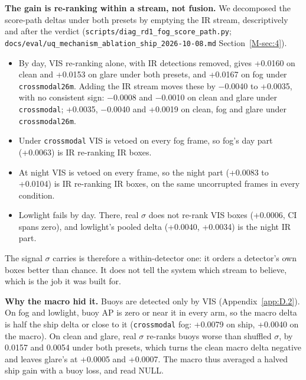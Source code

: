 \documentclass[journal,onecolumn]{IEEEtran}
\begin{document}
\textbf{The gain is re-ranking within a stream, not fusion.} We decomposed the score-path deltas under both presets by emptying the IR stream, descriptively and after the verdict (\texttt{scripts/\allowbreak{}diag\_\allowbreak{}rd1\_\allowbreak{}fog\_\allowbreak{}score\_\allowbreak{}path.py}; \texttt{docs/\allowbreak{}eval/\allowbreak{}uq\_\allowbreak{}mechanism\_\allowbreak{}ablation\_\allowbreak{}ship\_\allowbreak{}2026-\allowbreak{}10-\allowbreak{}08.md} Section~\ref{M-sec:4}).
\begin{itemize}
\item By day, VIS re-ranking alone, with IR detections removed, gives +0.0160 on clean and +0.0153 on glare under both presets, and +0.0167 on fog under \texttt{crossmodal26m}. Adding the IR stream moves these by $-$0.0040 to +0.0035, with no consistent sign: $-$0.0008 and $-$0.0010 on clean and glare under \texttt{crossmodal}; +0.0035, $-$0.0040 and +0.0019 on clean, fog and glare under \texttt{crossmodal26m}.
\item Under \texttt{crossmodal} VIS is vetoed on every fog frame, so fog's day part (+0.0063) is IR re-ranking IR boxes.
\item At night VIS is vetoed on every frame, so the night part (+0.0083 to +0.0104) is IR re-ranking IR boxes, on the same uncorrupted frames in every condition.
\item Lowlight fails by day. There, real $\sigma$ does not re-rank VIS boxes (+0.0006, CI spans zero), and lowlight's pooled delta (+0.0040, +0.0034) is the night IR part.
\end{itemize}

The signal $\sigma$ carries is therefore a within-detector one: it orders a detector's own boxes better than chance. It does not tell the system which stream to believe, which is the job it was built for.

\textbf{Why the macro hid it.} Buoys are detected only by VIS (Appendix~\ref{app:D.2}). On fog and lowlight, buoy AP is zero or near it in every arm, so the macro delta is half the ship delta or close to it (\texttt{crossmodal} fog: +0.0079 on ship, +0.0040 on the macro). On clean and glare, real $\sigma$ re-ranks buoys worse than shuffled $\sigma$, by 0.0157 and 0.0054 under both presets, which turns the clean macro delta negative and leaves glare's at +0.0005 and +0.0007. The macro thus averaged a halved ship gain with a buoy loss, and read NULL.
\end{document}

